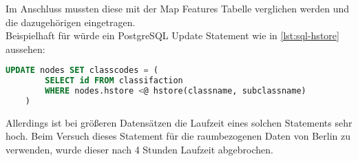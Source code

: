  Im Anschluss mussten diese mit der Map Features Tabelle verglichen werden und die dazugehörigen  eingetragen.\\
 
 Beispielhaft für  würde ein PostgreSQL Update Statement wie in \autoref{lst:sql-hstore} aussehen:
 \begin{lstlisting}[label={lst:sql-hstore},language=SQL,caption={PostgreSQL Statement mit hstore Werten}]
 	UPDATE nodes SET classcodes = (
		SELECT id FROM classifaction
		WHERE nodes.hstore <@ hstore(classname, subclassname)
 	)
 \end{lstlisting}
 
 Allerdings ist bei größeren Datensätzen die Laufzeit eines solchen Statements sehr hoch. Beim Versuch dieses Statement für die raumbezogenen Daten von Berlin zu verwenden, wurde dieser nach 4 Stunden Laufzeit abgebrochen.
 
 
